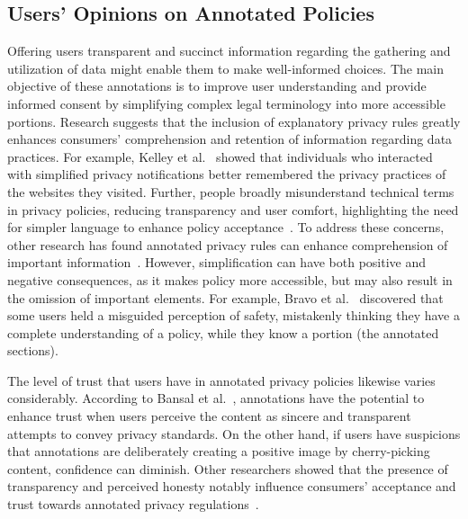 \subsection{Users’ Opinions on Annotated Policies}

Offering users transparent and succinct information regarding the gathering and utilization of data might enable them to make well-informed choices.
The main objective of these annotations is to improve user understanding and provide informed consent by simplifying complex legal terminology into more accessible portions.
Research suggests that the inclusion of explanatory privacy rules greatly enhances consumers' comprehension and retention of information regarding data practices.
For example, Kelley et al.~\cite{kelley2010standardizing} showed that individuals who interacted with simplified privacy notifications better remembered the privacy practices of the websites they visited.
Further, people broadly misunderstand technical terms in privacy policies, reducing transparency and user comfort, highlighting the need for simpler language to enhance policy acceptance~\cite{Tang2021defining}.
To address these concerns, other research has found annotated privacy rules can enhance comprehension of important information~\cite{reidenberg2015disagreeable}.
However, simplification can have both positive and negative consequences, as it makes policy more accessible, but may also result in the omission of important elements.
For example, Bravo et al.~\cite{bravo2010bridging} discovered that some users held a misguided perception of safety, mistakenly thinking they have a complete understanding of a policy, while they know a portion (the annotated sections).

The level of trust that users have in annotated privacy policies likewise varies considerably.
According to Bansal et al.~\cite{bansal2010impact}, annotations have the potential to enhance trust when users perceive the content as sincere and transparent attempts to convey privacy standards.
On the other hand, if users have suspicions that annotations are deliberately creating a positive image by cherry-picking content, confidence can diminish.
Other researchers showed that the presence of transparency and perceived honesty notably influence consumers' acceptance and trust towards annotated privacy regulations~\cite{schaub2015design}.

